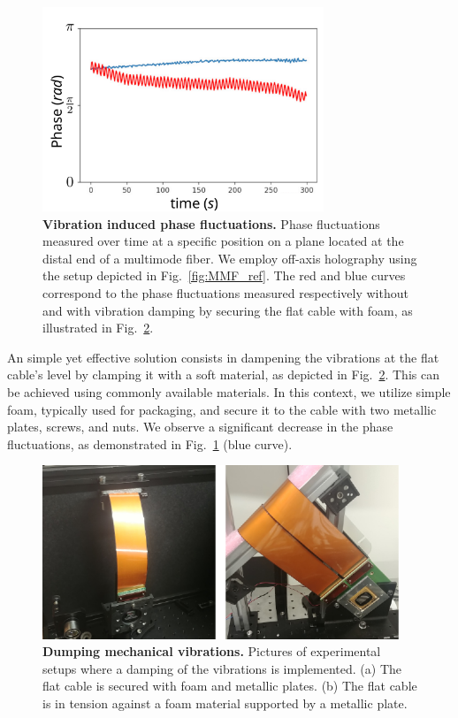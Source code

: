 \documentclass[12pt]{iopart}
\begin{document}
\begin{figure}[ht]
  \centering
  \includegraphics[width = 0.75\textwidth]{images/phase_vibrations.pdf}
  \caption{
    \textbf{Vibration induced phase fluctuations.}
    Phase fluctuations measured over time at
    a specific position on a plane located at the distal end of a multimode fiber.
    We employ off-axis holography using the setup depicted in Fig.~\ref{fig:MMF_ref}.
    The red and blue curves correspond to the phase fluctuations
    measured respectively without and with vibration damping
    by securing the flat cable with foam, as illustrated in Fig.~\ref{fig:dumping}.
  }
  \label{fig:phase_vibrations}
\end{figure}


An simple yet effective solution consists in dampening the vibrations
at the flat cable's level by clamping it with a soft material,
as depicted in Fig.~\ref{fig:dumping}.
This can be achieved using commonly available materials.
In this context, we utilize simple foam, typically used for packaging, and secure it to the cable
with two metallic plates, screws, and nuts.
We observe a significant decrease in the phase fluctuations,
as demonstrated in Fig.~\ref{fig:phase_vibrations} (blue curve).\\



\begin{figure}[ht]
  \centering
  \includegraphics[width = 0.95\textwidth]{images/dumping.pdf}
  \caption{
    \textbf{Dumping mechanical vibrations.}
    Pictures of experimental setups where a damping of the vibrations is implemented.
    (a) The flat cable is secured with foam and metallic plates.
    (b) The flat cable is in tension against a foam material supported by a metallic plate.
  }
  \label{fig:dumping}
\end{figure}
\end{document}
